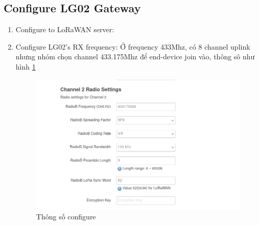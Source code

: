 \subsection{Configure LG02 Gateway}
\begin{enumerate}
    \item Configure to LoRaWAN server:

    \item Configure LG02's RX frequency: Ở frequency 433Mhz, có 8 channel uplink nhưng nhóm chọn channel 433.175Mhz để end-device join vào, thông sô như hình \ref{fig:radio_config}
    \begin{figure}[H]
        \centering
        \includegraphics[width=\textwidth]{images/Quanh/Radio_config.png}
        \caption{Thông số configure}
        \label{fig:radio_config}
    \end{figure}
\end{enumerate}


